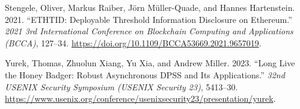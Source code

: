 \documentclass[
]{article}
\newlength{\cslhangindent}
\newenvironment{CSLReferences}[2] %
 {\begin{list}{}{%
  \setlength{\itemindent}{0pt}
  \setlength{\leftmargin}{0pt}
  \setlength{\parsep}{0pt}
  \ifodd #1
   \setlength{\leftmargin}{\cslhangindent}
   \setlength{\itemindent}{-1\cslhangindent}
  \fi
  \setlength{\itemsep}{#2\baselineskip}}}
 {\end{list}}
\begin{document}
\begin{CSLReferences}{1}{1}
Stengele, Oliver, Markus Raiber, Jörn Müller-Quade, and Hannes
Hartenstein. 2021. {``{ETHTID}: Deployable Threshold Information
Disclosure on {Ethereum}.''} \emph{2021 3rd International Conference on
Blockchain Computing and Applications ({BCCA})}, 127--34.
\url{https://doi.org/10.1109/BCCA53669.2021.9657019}.

Yurek, Thomas, Zhuolun Xiang, Yu Xia, and Andrew Miller. 2023. {``Long
Live the Honey Badger: Robust Asynchronous {DPSS} and Its
Applications.''} \emph{32nd USENIX Security Symposium (USENIX Security
23)}, 5413--30.
\url{https://www.usenix.org/conference/usenixsecurity23/presentation/yurek}.

\end{CSLReferences}
\end{document}

